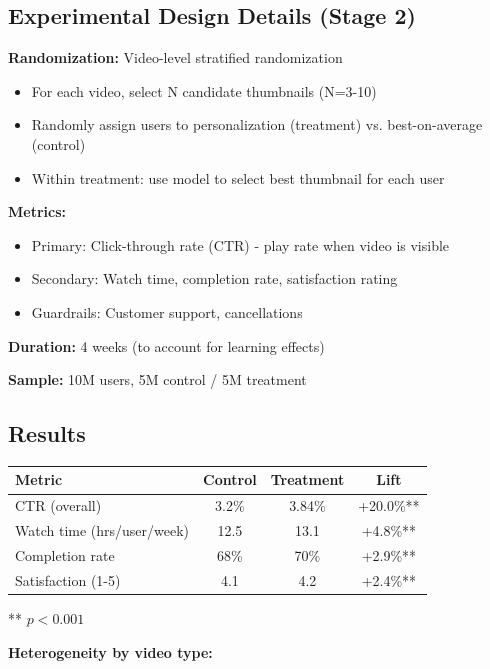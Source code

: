 \subsection{Experimental Design Details (Stage 2)}

\textbf{Randomization:} Video-level stratified randomization
\begin{itemize}
    \item For each video, select N candidate thumbnails (N=3-10)
    \item Randomly assign users to personalization (treatment) vs. best-on-average (control)
    \item Within treatment: use model to select best thumbnail for each user
\end{itemize}

\textbf{Metrics:}
\begin{itemize}
    \item Primary: Click-through rate (CTR) - play rate when video is visible
    \item Secondary: Watch time, completion rate, satisfaction rating
    \item Guardrails: Customer support, cancellations
\end{itemize}

\textbf{Duration:} 4 weeks (to account for learning effects)

\textbf{Sample:} 10M users, 5M control / 5M treatment

\subsection{Results}

\begin{center}
\begin{tabular}{lccc}
\toprule
\textbf{Metric} & \textbf{Control} & \textbf{Treatment} & \textbf{Lift} \\
\midrule
CTR (overall) & 3.2\% & 3.84\% & +20.0\%** \\
Watch time (hrs/user/week) & 12.5 & 13.1 & +4.8\%** \\
Completion rate & 68\% & 70\% & +2.9\%** \\
Satisfaction (1-5) & 4.1 & 4.2 & +2.4\%** \\
\bottomrule
\end{tabular}
\end{center}

** $p < 0.001$

\textbf{Heterogeneity by video type:}


